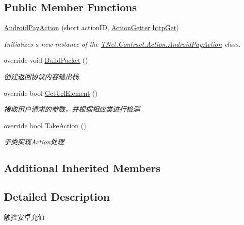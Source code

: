 \subsection*{Public Member Functions}
\begin{DoxyCompactItemize}
\item 
\mbox{\hyperlink{class_t_net_1_1_contract_1_1_action_1_1_android_pay_action_a26a9cb6746943c268a0a64d061c06e44}{Android\+Pay\+Action}} (short action\+ID, \mbox{\hyperlink{class_t_net_1_1_service_1_1_action_getter}{Action\+Getter}} \mbox{\hyperlink{class_t_net_1_1_service_1_1_base_struct_a04c1171f14d9ee44612f9966a8d61d30}{http\+Get}})
\begin{DoxyCompactList}\small\item\em Initializes a new instance of the \mbox{\hyperlink{class_t_net_1_1_contract_1_1_action_1_1_android_pay_action}{T\+Net.\+Contract.\+Action.\+Android\+Pay\+Action}} class. \end{DoxyCompactList}\item 
override void \mbox{\hyperlink{class_t_net_1_1_contract_1_1_action_1_1_android_pay_action_a244870e41516e232e4f2d78effd6b405}{Build\+Packet}} ()
\begin{DoxyCompactList}\small\item\em 创建返回协议内容输出栈 \end{DoxyCompactList}\item 
override bool \mbox{\hyperlink{class_t_net_1_1_contract_1_1_action_1_1_android_pay_action_a3d23fbaeea52cabdb937d5582b98829a}{Get\+Url\+Element}} ()
\begin{DoxyCompactList}\small\item\em 接收用户请求的参数，并根据相应类进行检测 \end{DoxyCompactList}\item 
override bool \mbox{\hyperlink{class_t_net_1_1_contract_1_1_action_1_1_android_pay_action_aaadcdc3f7633432ae0a8925e4a287617}{Take\+Action}} ()
\begin{DoxyCompactList}\small\item\em 子类实现\+Action处理 \end{DoxyCompactList}\end{DoxyCompactItemize}
\subsection*{Additional Inherited Members}


\subsection{Detailed Description}
触控安卓充值 



